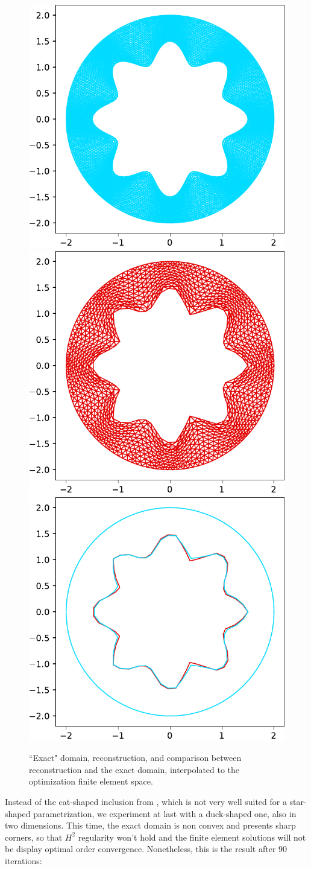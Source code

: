 \documentclass[english,a4paper,10pt,oneside]{scrbook}	%
\theoremstyle{break}
\theoremstyle{remark}
\begin{document}
\begin{figure}[H]
\centering
\includegraphics[height=0.3\columnwidth]{Images/sea_urchin/exact_domain.pdf}
\includegraphics[height=0.3\columnwidth]{Images/sea_urchin/estimated_domain.pdf}
\includegraphics[height=0.3\columnwidth]{Images/sea_urchin/comparison.pdf}
\caption{``Exact" domain, reconstruction, and comparison between reconstruction and the exact domain, interpolated to the optimization finite element space.}\label{fig:sea_urchin}
\end{figure}

Instead of the cat-shaped inclusion from \cite{harbrecht}, which is not very well suited for a star-shaped parametrization, we experiment at last with a duck-shaped one, also in two dimensions. This time, the exact domain is non convex and presents sharp corners, so that $H^2$ regularity won't hold and the finite element solutions will not be display optimal order convergence. Nonetheless, this is the result after $90$ iterations:
\end{document}
